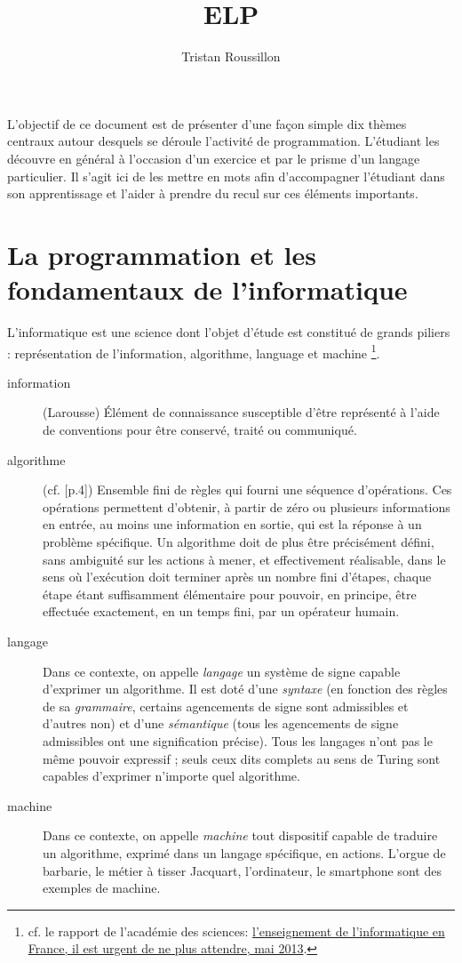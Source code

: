 \documentclass[a4paper,francais]{insalyon}
\title{ELP}
\author{Tristan Roussillon}
\begin{document}
\maketitle

L'objectif de ce document est de présenter d'une façon simple dix thèmes centraux autour desquels se déroule l'activité de programmation. L'étudiant les découvre en général à l'occasion d'un exercice et par le prisme d'un langage particulier. Il s'agit ici de les mettre en mots afin d'accompagner l'étudiant dans son apprentissage et l'aider à prendre du recul sur ces éléments importants. 

\section{La programmation et les fondamentaux de l'informatique}

L'informatique est une science dont l'objet d'étude est constitué de grands piliers : représentation de l'information, algorithme, language et machine
\footnote{cf. le rapport de l'académie des sciences:
  \href{https://www.academie-sciences.fr/pdf/rapport/rads\_0513.pdf}
  {l'enseignement de l'informatique en France, il est urgent de ne plus attendre, mai 2013}.
  }.
\begin{description}
\item[information] (Larousse) Élément de connaissance susceptible d'être représenté à l'aide de conventions pour être conservé, traité ou communiqué. 
\item[algorithme] (cf. \cite{knuth}[p.4]) Ensemble fini de règles qui fourni une séquence d'opérations. Ces opérations permettent d'obtenir, à partir de zéro ou plusieurs informations en entrée, au moins une information en sortie, qui est la réponse à un problème spécifique. Un algorithme doit de plus être précisément défini, sans ambiguité sur les actions à mener, et effectivement réalisable, dans le sens où l'exécution doit terminer après un nombre fini d'étapes, chaque étape étant suffisamment élémentaire pour pouvoir, en principe, être effectuée exactement, en un temps fini, par un opérateur humain.
\item[langage] Dans ce contexte, on appelle \emph{langage} un système de signe capable d'exprimer un algorithme. Il est doté d'une \emph{syntaxe} (en fonction des règles de sa \emph{grammaire}, certains agencements de signe sont admissibles et d'autres non) et d'une \emph{sémantique} (tous les agencements de signe admissibles ont une signification précise). Tous les langages n'ont pas le même pouvoir expressif ; seuls ceux dits complets au sens de Turing sont capables d'exprimer n'importe quel algorithme.  
\item[machine] Dans ce contexte, on appelle \emph{machine} tout dispositif capable de traduire un algorithme, exprimé dans un langage spécifique, en actions. L'orgue de barbarie, le métier à tisser Jacquart, l'ordinateur, le smartphone sont des exemples de machine. 
\end{description}
\end{document}
